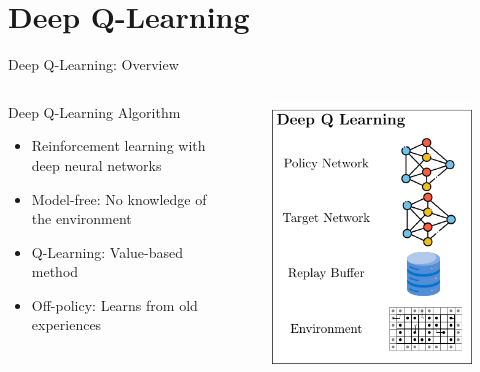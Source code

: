 \documentclass[10pt,xcolor=table, aspectratio=1610]{beamer}
\begin{document}
\section{Deep Q-Learning}
\begin{frame}{Deep Q-Learning: Overview}
    \begin{columns}
      \begin{block}{Deep Q-Learning Algorithm}
        \begin{itemize}
          \item Reinforcement learning with deep neural networks
          \item Model-free: No knowledge of the environment
          \item Q-Learning: Value-based method
          \item Off-policy: Learns from old experiences
        \end{itemize}
      \end{block}
      \begin{figure}
        \includegraphics[width=\textwidth]{img/out/dql.pdf}
      \end{figure}
    \end{columns}
\end{frame}
\end{document}
